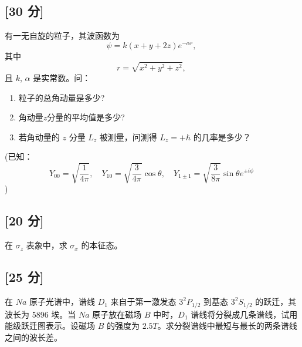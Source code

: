 \subsection{[30 分]}
有一无自旋的粒子，其波函数为
\[
\psi = k(x + y + 2z)e^{-\alpha r},~
\]
其中
\[
r = \sqrt{x^2 + y^2 + z^2},~
\]
且 $k$, $\alpha$ 是实常数。问：
\begin{enumerate}
\item 粒子的总角动量是多少?
\item 角动量$z$分量的平均值是多少?
\item 若角动量的 $z$ 分量 $L_z$ 被测量，问测得 $L_z = +\hbar$ 的几率是多少？
\end{enumerate}
(已知：
\[
Y_{00} = \sqrt{\frac{1}{4\pi}}, \quad Y_{10} = \sqrt{\frac{3}{4\pi}} \cos\theta, \quad Y_{1\pm1} = \sqrt{\frac{3}{8\pi}} \sin\theta e^{\pm i\phi}~
\])
\subsection{[20 分]}
在 $\sigma_z$ 表象中，求 $\sigma_x$ 的本征态。
\subsection{[25 分]}
在 $Na$ 原子光谱中，谱线 $D_1$ 来自于第一激发态 $3^2P_{1/2}$ 到基态 $3^2S_{1/2}$ 的跃迁，其波长为 5896 埃。当 $Na$ 原子放在磁场 $B$ 中时，$D_1$ 谱线将分裂成几条谱线，试用能级跃迁图表示。设磁场 $B$ 的强度为 $2.5T$。求分裂谱线中最短与最长的两条谱线之间的波长差。